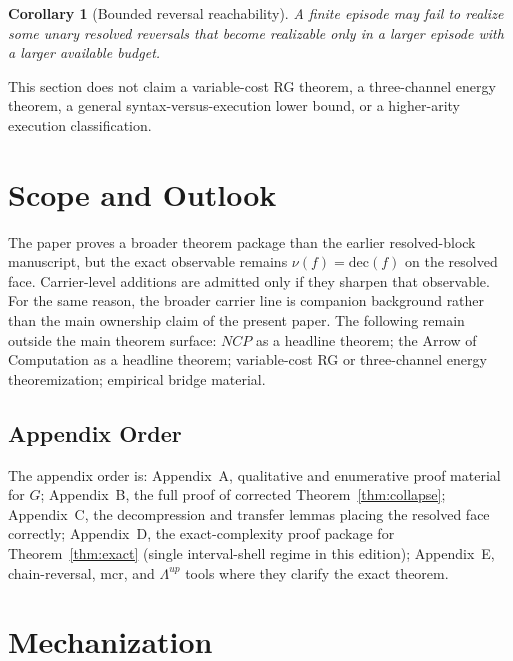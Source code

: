 \documentclass[11pt]{article}
\newtheorem{corollary}{Corollary}
\theoremstyle{remark}
\newcommand{\dec}{\ensuremath{\mathrm{dec}}}
\begin{document}
\begin{corollary}[Bounded reversal reachability]
A finite episode may fail to realize some unary resolved reversals that
become realizable only in a larger episode with a larger available budget.
\end{corollary}

This section does not claim a variable-cost RG theorem, a three-channel
energy theorem, a general syntax-versus-execution lower bound, or a
higher-arity execution classification.

\section{Scope and Outlook}

The paper proves a broader theorem package than the earlier resolved-block
manuscript, but the exact observable remains $\nu(f)=\dec(f)$ on the
resolved face. Carrier-level additions are admitted only if they sharpen
that observable. For the same reason, the broader carrier line is companion
background rather than the main ownership claim of the present paper. The
following remain outside the main theorem surface: $NCP$ as a headline
theorem; the Arrow of Computation as a headline theorem; variable-cost RG
or three-channel energy theoremization; empirical bridge material.

\subsection{Appendix Order}
The appendix order is: Appendix~A, qualitative and enumerative proof
material for $G$; Appendix~B, the full proof of corrected
Theorem~\ref{thm:collapse}; Appendix~C, the decompression and transfer
lemmas placing the resolved face correctly; Appendix~D, the
exact-complexity proof package for Theorem~\ref{thm:exact} (single
interval-shell regime in this edition); Appendix~E, chain-reversal, mcr,
and $\Lambda^{up}$ tools where they clarify the exact theorem.

\section{Mechanization}\label{sec:mech}
\end{document}
